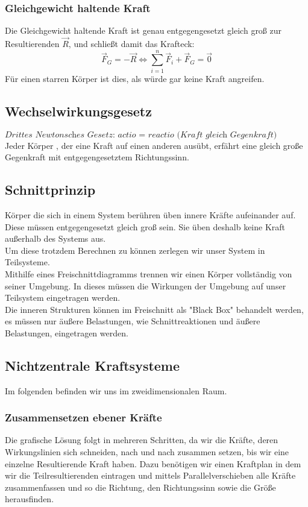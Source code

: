 \documentclass[a4paper,parskip=half*,DIV=7,fontsize=11pt]{scrartcl}
\begin{document}
	\subsubsection{Gleichgewicht haltende Kraft}
	Die Gleichgewicht haltende Kraft ist genau entgegengesetzt gleich groß zur Resultierenden $\overrightarrow{R}$, und schließt damit das Krafteck:\\
	$$\overrightarrow{F}_G=-\overrightarrow{R} \Leftrightarrow \sum_{i=1}^{n} \overrightarrow{F}_i+\overrightarrow{F}_G=\overrightarrow{0}$$
	Für einen starren Körper ist dies, als würde gar keine Kraft angreifen.
	
	\subsection{Wechselwirkungsgesetz}
	$\textit{Drittes Newtonsches Gesetz: actio = reactio (Kraft gleich Gegenkraft)}$\\
	Jeder Körper , der eine Kraft auf einen anderen ausübt, erfährt eine gleich große Gegenkraft mit entgegengesetztem Richtungssinn.
	
	\subsection{Schnittprinzip}
	Körper die sich in einem System berühren üben innere Kräfte aufeinander auf. Diese müssen entgegengesetzt gleich groß sein. Sie üben deshalb keine Kraft außerhalb des Systems aus.\\
	Um diese trotzdem Berechnen zu können zerlegen wir unser System in Teilsysteme.\\
	Mithilfe eines Freischnittdiagramms trennen wir einen Körper vollständig von seiner Umgebung. In dieses müssen die Wirkungen der Umgebung auf unser Teilsystem eingetragen werden.\\
	Die inneren Strukturen können im Freischnitt als "Black Box" behandelt werden, es müssen nur äußere Belastungen, wie Schnittreaktionen und äußere Belastungen, eingetragen werden.
	
	\subsection{Nichtzentrale Kraftsysteme}
	Im folgenden befinden wir uns im zweidimensionalen Raum.
	
	\subsubsection{Zusammensetzen ebener Kräfte}
	Die grafische Lösung folgt in mehreren Schritten, da wir die Kräfte, deren Wirkungslinien sich schneiden, nach und nach zusammen setzen, bis wir eine einzelne Resultierende Kraft haben. Dazu benötigen wir einen Kraftplan in dem wir die Teilresultierenden eintragen und mittels Parallelverschieben alle Kräfte zusammenfassen und so die Richtung, den Richtungssinn sowie die Größe herausfinden.
	
\end{document}
